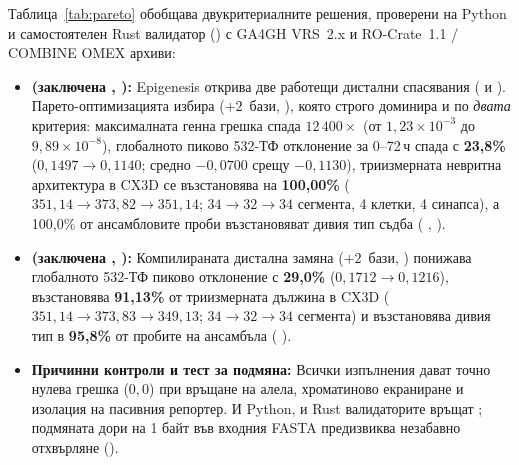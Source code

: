 \documentclass[10.5pt,a4paper]{article}
\begin{document}
Таблица~\ref{tab:pareto} обобщава двукритериалните решения, проверени на Python и самостоятелен Rust валидатор () с GA4GH VRS~2.x и RO-Crate~1.1 / COMBINE OMEX архиви:
\begin{itemize}
\item \textbf{ (заключена , ):} Epigenesis открива две работещи дистални спасявания ( и ). Парето-оптимизацията избира \textbf{} ($+2$~бази, ), която строго доминира  и по \emph{двата} критерия: максималната генна грешка спада $12\,400\times$ (от $1{,}23\times10^{-3}$ до \textbf{$9{,}89\times10^{-8}$}), глобалното пиково 532-ТФ отклонение за 0--72\,ч спада с \textbf{23,8\%} ($0{,}1497\to 0{,}1140$; средно $-0{,}0700$ срещу $-0{,}1130$), триизмерната невритна архитектура в CX3D се възстановява на \textbf{100,00\%} ($351{,}14\to 373{,}82\to 351{,}14$; $34\to 32\to 34$ сегмента, 4 клетки, 4 синапса), а 100,0\% от ансамбловите проби възстановяват дивия тип съдба ( ,  ).
\item \textbf{ (заключена , ):} Компилираната дистална замяна \textbf{} ($+2$~бази, ) понижава глобалното 532-ТФ пиково отклонение с \textbf{29,0\%} ($0{,}1712\to 0{,}1216$), възстановява \textbf{91,13\%} от триизмерната дължина в CX3D ($351{,}14\to 373{,}83\to 349{,}13$; $34\to 32\to 34$ сегмента) и възстановява дивия тип в \textbf{95,8\%} от пробите на ансамбъла ( ).
\item \textbf{Причинни контроли и тест за подмяна:} Всички изпълнения дават точно нулева грешка ($0{,}0$) при връщане на алела, хроматиново екраниране и изолация на пасивния репортер. И Python, и Rust валидаторите връщат ; подмяната дори на 1 байт във входния FASTA предизвиква незабавно отхвърляне ().
\end{itemize}
\end{document}
